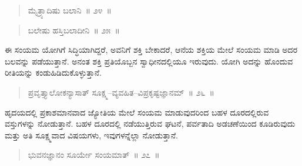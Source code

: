 \vspace{-0.3cm}

\begin{verse}
ಮೈತ್ರ್ಯಾದಿಷು ಬಲಾನಿ~॥ ೨೪~॥
\end{verse}

\vspace{-0.4cm}


\vspace{-0.2cm}

\begin{verse}
ಬಲೇಷು ಹಸ್ತಿಬಲಾದೀನಿ~॥ ೨೫~॥
\end{verse}

\vspace{-0.4cm}


\vspace{0.1cm}

ಈ ಸಂಯಮ ಯೋಗಿಗೆ ಸಿದ್ಧಿಯಾಗಿದ್ದರೆ, ಅವನಿಗೆ ಶಕ್ತಿ ಬೇಕಾದರೆ, ಆನೆಯ ಶಕ್ತಿಯ ಮೇಲೆ ಸಂಯಮ ಮಾಡಿ ಅದರ ಬಲವನ್ನು ಪಡೆಯುತ್ತಾನೆ. ಅನಂತ ಶಕ್ತಿ ಪ್ರತಿಯೊಬ್ಬನ ಸ್ವಾಧೀನದಲ್ಲಿಯೂ ಇರುವುದು. ಯೋಗಿ ಅದನ್ನು ಹೊಂದುವ ರೀತಿಯನ್ನು ಕಂಡುಹಿಡಿದುಕೊಳ್ಳುತ್ತಾನೆ. 

\vspace{-0.2cm}

\begin{verse}
ಪ್ರವೃತ್ತ್ಯಾಲೋಕನ್ಯಾಸಾತ್​ ಸೂಕ್ಷ್ಮ–ವ್ಯವಹಿತ–ವಿಪ್ರಕೃಷ್ಟಜ್ಞಾನಮ್​~॥ ೨೬~॥
\end{verse}

\vspace{-0.4cm}


\vspace{0.1cm}

ಹೃದಯದಲ್ಲಿ ಪ್ರಕಾಶಮಾನವಾದ ಜ್ಯೋತಿಯ ಮೇಲೆ ಸಂಯಮ ಮಾಡುವುದರಿಂದ ಬಹಳ ದೂರದಲ್ಲಿರುವ ವಸ್ತುಗಳನ್ನು ನೋಡುತ್ತಾನೆ. ಬಹಳ ದೂರದಲ್ಲಿ ನಡೆಯುತ್ತಿರುವ ಘಟನೆ, ಪರ್ವತಾದಿ ಅಡಚಣೆಯಿಂದ ಕೂಡಿರುವುದು ಮತ್ತು ಅತಿ ಸೂಕ್ಷ್ಮವಾದ ವಿಷಯಗಳು, ಇವುಗಳನ್ನೆಲ್ಲಾ ನೋಡುತ್ತಾನೆ. 

\vspace{-0.2cm}

\begin{verse}
ಭುವನಜ್ಞಾನಂ ಸೂರ್ಯೇ ಸಂಯಮಾತ್​~॥ ೨೭~॥
\end{verse}

\vspace{-0.4cm}

